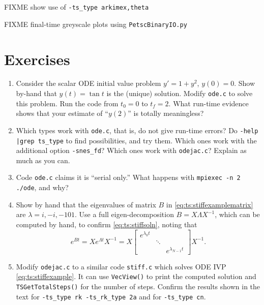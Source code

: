 
FIXME show use of \texttt{-ts\_type arkimex,theta}

FIXME final-time greyscale plots using \texttt{PetscBinaryIO.py}


\section{Exercises}

\renewcommand{\labelenumi}{\arabic{chapter}.\arabic{enumi}\quad}
\renewcommand{\labelenumii}{(\alph{enumii})}
\begin{enumerate}
\item \label{exer:ts:tan}  Consider the scalar ODE initial value problem $y'=1+y^2$, $y(0)=0$.  Show by-hand that $y(t)=\tan t$ is the (unique) solution.  Modify \texttt{ode.c} to solve this problem.  Run the code from $t_0=0$ to $t_f=2$.  What run-time evidence shows that your estimate of ``$y(2)$'' is totally meaningless?

\item \label{exer:ts:odepossible}  Which \pTS types work with \texttt{ode.c}, that is, do not give run-time errors?  Do \texttt{-help |grep ts\_type} to find possibilities, and try them.  Which ones work with the additional option \texttt{-snes\_fd}?  Which ones work with \texttt{odejac.c}?  Explain as much as you can.

\item \label{exer:ts:odeserial}  Code \texttt{ode.c} claims it is ``serial only.''  What happens with \texttt{mpiexec -n 2 ./ode}, and why?

\item \label{exer:ts:stiffexample}  Show by hand that the eigenvalues of matrix $B$ in \eqref{eq:ts:stiffexamplematrix} are $\lambda=i,-i,-101$.  Use a full eigen-decomposition $B = X \Lambda X^{-1}$, which can be computed by hand, to confirm \eqref{eq:ts:stiffsoln}, noting that
    $$e^{Bt} = X e^{\Lambda t} X^{-1} = X \begin{bmatrix} e^{\lambda_0 t} &  &  \\
                       & \ddots &  \\
                       & & e^{\lambda_{N-1} t} \end{bmatrix} X^{-1}.$$

\item \label{exer:ts:stiffcode}  Modify \texttt{odejac.c} to a similar code \texttt{stiff.c} which solves ODE IVP \eqref{eq:ts:stiffexample}.  It can use \texttt{VecView()} to print the computed solution and \texttt{TSGetTotalSteps()} for the number of steps.  Confirm the results shown in the text for \texttt{-ts\_type rk -ts\_rk\_type 2a} and for \texttt{-ts\_type cn}.


\end{enumerate}
